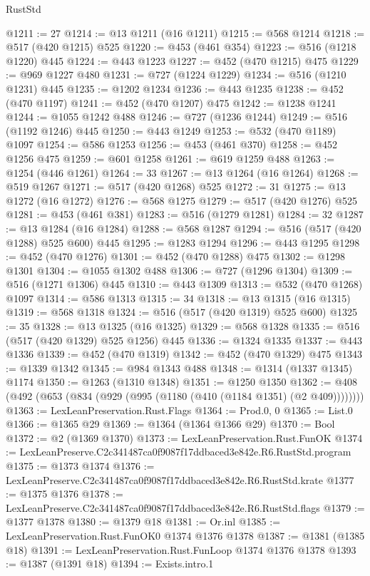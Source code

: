 \begin{lexlean}{RustStd}
\begin{coremodule}
@1211 := 27
@1214 := @13 @1211 (@16 @1211)
@1215 := @568 @1214
@1218 := @517 (@420 @1215) @525
@1220 := @453 (@461 @354)
@1223 := @516 (@1218 @1220) @445
@1224 := @443 @1223
@1227 := @452 (@470 @1215) @475
@1229 := @969 @1227 @480
@1231 := @727 (@1224 @1229)
@1234 := @516 (@1210 @1231) @445
@1235 := @1202 @1234
@1236 := @443 @1235
@1238 := @452 (@470 @1197)
@1241 := @452 (@470 @1207) @475
@1242 := @1238 @1241
@1244 := @1055 @1242 @488
@1246 := @727 (@1236 @1244)
@1249 := @516 (@1192 @1246) @445
@1250 := @443 @1249
@1253 := @532 (@470 @1189) @1097
@1254 := @586 @1253
@1256 := @453 (@461 @370)
@1258 := @452 @1256 @475
@1259 := @601 @1258
@1261 := @619 @1259 @488
@1263 := @1254 (@446 @1261)
@1264 := 33
@1267 := @13 @1264 (@16 @1264)
@1268 := @519 @1267
@1271 := @517 (@420 @1268) @525
@1272 := 31
@1275 := @13 @1272 (@16 @1272)
@1276 := @568 @1275
@1279 := @517 (@420 @1276) @525
@1281 := @453 (@461 @381)
@1283 := @516 (@1279 @1281)
@1284 := 32
@1287 := @13 @1284 (@16 @1284)
@1288 := @568 @1287
@1294 := @516 (@517 (@420 @1288) @525 @600) @445
@1295 := @1283 @1294
@1296 := @443 @1295
@1298 := @452 (@470 @1276)
@1301 := @452 (@470 @1288) @475
@1302 := @1298 @1301
@1304 := @1055 @1302 @488
@1306 := @727 (@1296 @1304)
@1309 := @516 (@1271 @1306) @445
@1310 := @443 @1309
@1313 := @532 (@470 @1268) @1097
@1314 := @586 @1313
@1315 := 34
@1318 := @13 @1315 (@16 @1315)
@1319 := @568 @1318
@1324 := @516 (@517 (@420 @1319) @525 @600)
@1325 := 35
@1328 := @13 @1325 (@16 @1325)
@1329 := @568 @1328
@1335 := @516 (@517 (@420 @1329) @525 @1256) @445
@1336 := @1324 @1335
@1337 := @443 @1336
@1339 := @452 (@470 @1319)
@1342 := @452 (@470 @1329) @475
@1343 := @1339 @1342
@1345 := @984 @1343 @488
@1348 := @1314 (@1337 @1345) @1174
@1350 := @1263 (@1310 @1348)
@1351 := @1250 @1350
@1362 := @408 (@492 (@653 (@834 (@929 (@995 (@1180 (@410 (@1184 @1351) (@2 @409))))))))
@1363 := LexLeanPreservation.Rust.Flags
@1364 := Prod.{0, 0}
@1365 := List.{0}
@1366 := @1365 @29
@1369 := @1364 (@1364 @1366 @29)
@1370 := Bool
@1372 := @2 (@1369 @1370)
@1373 := LexLeanPreservation.Rust.FunOK
@1374 := LexLeanPreserve.C2c341487ca0f9087f17ddbaced3e842e.R6.RustStd.program
@1375 := @1373 @1374
@1376 := LexLeanPreserve.C2c341487ca0f9087f17ddbaced3e842e.R6.RustStd.krate
@1377 := @1375 @1376
@1378 := LexLeanPreserve.C2c341487ca0f9087f17ddbaced3e842e.R6.RustStd.flags
@1379 := @1377 @1378
@1380 := @1379 @18
@1381 := Or.inl
@1385 := LexLeanPreservation.Rust.FunOK0 @1374 @1376 @1378
@1387 := @1381 (@1385 @18)
@1391 := LexLeanPreservation.Rust.FunLoop @1374 @1376 @1378
@1393 := @1387 (@1391 @18)
@1394 := Exists.intro.{1}

\end{coremodule}
\end{lexlean}
